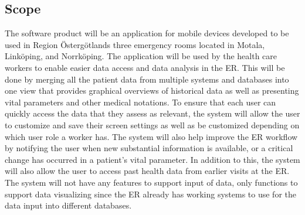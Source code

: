 \subsection{Scope}
The software product will be an application for mobile devices developed to be used in Region Östergötlands three emergency rooms located in Motala, Linköping, and Norrköping. The application will be used by the health care workers to enable easier data access and data analysis in the ER. This will be done by merging all the patient data from multiple systems and databases into one view that provides graphical overviews of historical data as well as presenting vital parameters and other medical notations. To ensure that each user can quickly access the data that they assess as relevant, the system will allow the user to customize and save their screen settings as well as be customized depending on which user role a worker has. The system will also help improve the ER workflow by notifying the user when new substantial information is available, or a critical change has occurred in a patient's vital parameter. In addition to this, the system will also allow the user to access past health data from earlier visits at the ER. The system will not have any features to support input of data, only functions to support data visualizing since the ER already has working systems to use for the data input into different databases.

